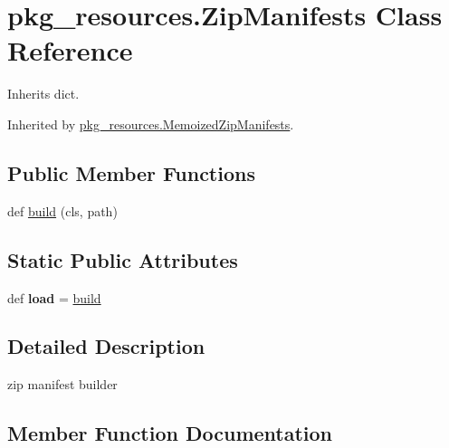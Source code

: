 \hypertarget{classpkg__resources_1_1_zip_manifests}{}\section{pkg\+\_\+resources.\+Zip\+Manifests Class Reference}
\label{classpkg__resources_1_1_zip_manifests}


Inherits dict.



Inherited by \hyperlink{classpkg__resources_1_1_memoized_zip_manifests}{pkg\+\_\+resources.\+Memoized\+Zip\+Manifests}.

\subsection*{Public Member Functions}
\begin{DoxyCompactItemize}
\item 
def \hyperlink{classpkg__resources_1_1_zip_manifests_abe93fa68a3c85fc254dc117af87a0703}{build} (cls, path)
\end{DoxyCompactItemize}
\subsection*{Static Public Attributes}
\begin{DoxyCompactItemize}
\item 
\mbox{\label{classpkg__resources_1_1_zip_manifests_a578e99b9bc5f0654c06ec90d919b2cb6}} 
def {\bfseries load} = \hyperlink{classpkg__resources_1_1_zip_manifests_abe93fa68a3c85fc254dc117af87a0703}{build}
\end{DoxyCompactItemize}


\subsection{Detailed Description}
\begin{DoxyVerb}zip manifest builder
\end{DoxyVerb}
 

\subsection{Member Function Documentation}
\mbox{\label{classpkg__resources_1_1_zip_manifests_abe93fa68a3c85fc254dc117af87a0703}} 
